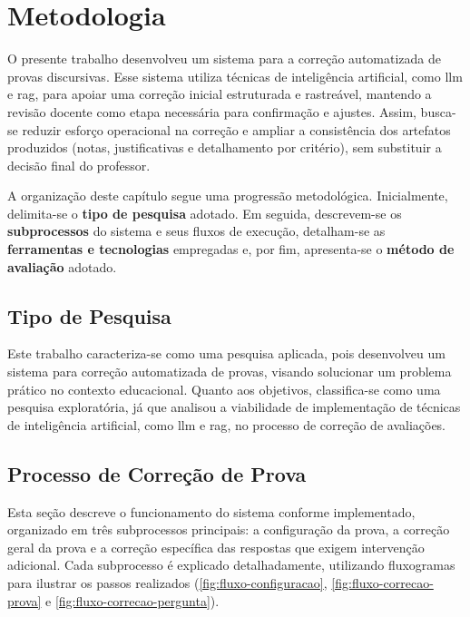 \chapter{Metodologia}
\label{cap:metodologia}


O presente trabalho desenvolveu um sistema para a correção automatizada de provas discursivas. Esse sistema utiliza técnicas de inteligência artificial, como \gls{llm} e \gls{rag}, para apoiar uma correção inicial estruturada e rastreável, mantendo a revisão docente como etapa necessária para confirmação e ajustes. Assim, busca-se reduzir esforço operacional na correção e ampliar a consistência dos artefatos produzidos (notas, justificativas e detalhamento por critério), sem substituir a decisão final do professor.

A organização deste capítulo segue uma progressão metodológica. Inicialmente, delimita-se o \textbf{tipo de pesquisa} adotado. Em seguida, descrevem-se os \textbf{subprocessos} do sistema e seus fluxos de execução, detalham-se as \textbf{ferramentas e tecnologias} empregadas e, por fim, apresenta-se o \textbf{método de avaliação} adotado.

\section{Tipo de Pesquisa}

Este trabalho caracteriza-se como uma pesquisa aplicada, pois desenvolveu um sistema para correção automatizada de provas, visando solucionar um problema prático no contexto educacional. Quanto aos objetivos, classifica-se como uma pesquisa exploratória, já que analisou a viabilidade de implementação de técnicas de inteligência artificial, como \gls{llm} e \gls{rag}, no processo de correção de avaliações.

\section{Processo de Correção de Prova}

Esta seção descreve o funcionamento do sistema conforme implementado, organizado em três subprocessos principais: a configuração da prova, a correção geral da prova e a correção específica das respostas que exigem intervenção adicional. Cada subprocesso é explicado detalhadamente, utilizando fluxogramas para ilustrar os passos realizados (\autoref{fig:fluxo-configuracao},
\autoref{fig:fluxo-correcao-prova} e
\autoref{fig:fluxo-correcao-pergunta}).


